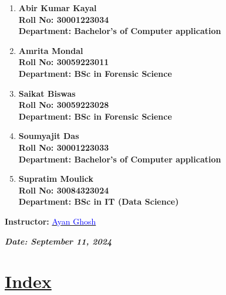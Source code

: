 \documentclass[a4paper,12pt]{article}
\begin{document}
\begin{titlepage}
    \normalsize
    \begin{enumerate}
        \item \textbf{Abir Kumar Kayal}\\
              \textbf{Roll No: 30001223034}\\
              \textbf{Department: Bachelor's of Computer application}
        \item \textbf{Amrita Mondal}\\
              \textbf{Roll No: 30059223011}\\
              \textbf{Department: BSc in Forensic Science}
        \item \textbf{Saikat Biswas}\\
              \textbf{Roll No: 30059223028}\\
              \textbf{Department: BSc in Forensic Science}
        \item \textbf{Soumyajit Das}\\
              \textbf{Roll No: 30001223033}\\
              \textbf{Department: Bachelor's of Computer application}
        \item \textbf{Supratim Moulick}\\
              \textbf{Roll No: 30084323024}\\
              \textbf{Department: BSc in IT (Data Science)}
    \end{enumerate}
    \vspace{0.8 cm}
    
    \textbf{Instructor:} \href{mailto:ayan.ghosh@university.edu}{\textcolor{blue}{Ayan Ghosh}}\\
    \vspace{0.2cm}
    
    \textbf{\textit{Date: September 11, 2024}}

\end{titlepage}
\newpage
{}
\vspace{-2cm}

\centering
\section*{\underline{\Huge\textbf{\textcolor{blue!60}{Index}}}}
\vspace{0.5cm}
\end{document}
